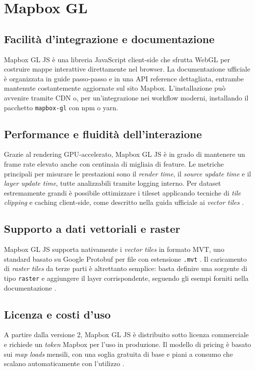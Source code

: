 \section{Mapbox GL}
\label{ch:mapbox}

\subsection{Facilità d'integrazione e documentazione}
Mapbox GL JS è una libreria JavaScript client-side che sfrutta WebGL per costruire
mappe interattive direttamente nel browser. La documentazione ufficiale è
organizzata in guide passo‑passo e in una API reference dettagliata, entrambe mantenute
costantemente aggiornate sul sito Mapbox. L'installazione può avvenire tramite
CDN o, per un'integrazione nei workflow moderni, installando il pacchetto
\texttt{mapbox-gl} con npm o yarn. \cite{mapbox-docs}

\subsection{Performance e fluidità dell'interazione}
Grazie al rendering GPU‑accelerato, Mapbox GL JS è in grado di mantenere un
frame rate elevato anche con centinaia di migliaia di feature. Le metriche principali
per misurare le prestazioni sono il \emph{render time}, il \emph{source update
time} e il \emph{layer update time}, tutte analizzabili tramite logging interno.
Per dataset estremamente grandi è possibile ottimizzare i tileset applicando tecniche
di \emph{tile clipping} e caching client-side, come descritto nella guida ufficiale
ai \textit{vector tiles} \cite{mapbox-vector, article-highperf}.

\subsection{Supporto a dati vettoriali e raster}
Mapbox GL JS supporta nativamente i \emph{vector tiles} in formato MVT, uno
standard basato su Google Protobuf per file con estensione \texttt{.mvt} \cite{mapbox-vector}.
Il caricamento di \emph{raster tiles} da terze parti è altrettanto semplice:
basta definire una sorgente di tipo \texttt{raster} e aggiungere il layer corrispondente,
seguendo gli esempi forniti nella documentazione \cite{mapbox-raster}.

\subsection{Licenza e costi d'uso}
A partire dalla versione 2, Mapbox GL JS è distribuito sotto licenza commerciale
e richiede un \textit{token} Mapbox per l'uso in produzione. Il modello di pricing
è basato sui \emph{map loads} mensili, con una soglia gratuita di base e piani a
consumo che scalano automaticamente con l'utilizzo \cite{mapbox-license-v2, mapbox-pricing}.

